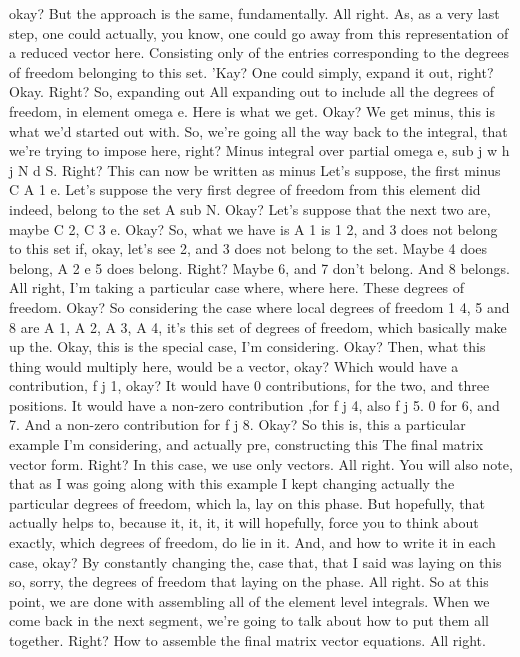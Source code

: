 \documentclass[10pt]{article}
\begin{document}
okay? But the approach is the same, fundamentally. All right. As, as a very last step, one could actually, you know, one could go away from this representation of a reduced vector here. Consisting only of the entries corresponding to the degrees of freedom belonging to this set. 'Kay? One could simply, expand it out, right? Okay. Right? So, expanding out All  expanding out to include all the degrees of freedom, in element omega e. Here is what we get. Okay? We get minus, this is what we'd started out with. So, we're going all the way back to the integral, that we're trying to impose here, right? Minus integral over partial omega e, sub j w h j N d S. Right? This can now be written as minus Let's suppose, the first minus C A 1 e. Let's suppose the very first degree of freedom from this element did indeed, belong to the set A sub N. Okay? Let's suppose that the next two are, maybe C 2, C 3 e. Okay? So, what we have is A 1 is 1 2, and 3 does not belong to this set if, okay, let's see 2, and 3 does not belong to the set. Maybe 4 does belong, A 2 e 5 does belong. Right? Maybe 6, and 7 don't belong. And 8 belongs. All right, I'm taking a particular case where, where here. These degrees of freedom. Okay? So considering the case where local degrees of freedom 1 4, 5 and 8 are A 1, A 2, A 3, A 4, it's this set of degrees of freedom, which basically make up the. Okay, this is the special case, I'm considering. Okay? Then, what this thing would multiply here, would be a vector, okay? Which would have a contribution, f j 1, okay? It would have 0 contributions, for the two, and three positions. It would have a non-zero contribution ,for f j 4, also f j 5. 0 for 6, and 7. And a non-zero contribution for f j 8. Okay? So this is, this a particular example I'm considering, and actually pre, constructing this The final matrix vector form. Right? In this case, we use only vectors. All right. You will also note, that as I was going along with this example I kept changing actually the particular degrees of freedom, which la, lay on this phase. But hopefully, that actually helps to, because it, it, it, it will hopefully, force you to think about exactly, which degrees of freedom, do lie in it. And, and how to write it in each case, okay? By constantly changing the, case that, that I said was laying on this so, sorry, the degrees of freedom that laying on the phase. All right. So at this point, we are done with assembling all of the element level integrals. When we come back in the next segment, we're going to talk about how to put them all together. Right? How to assemble the final matrix vector equations. All right.
\end{document}
